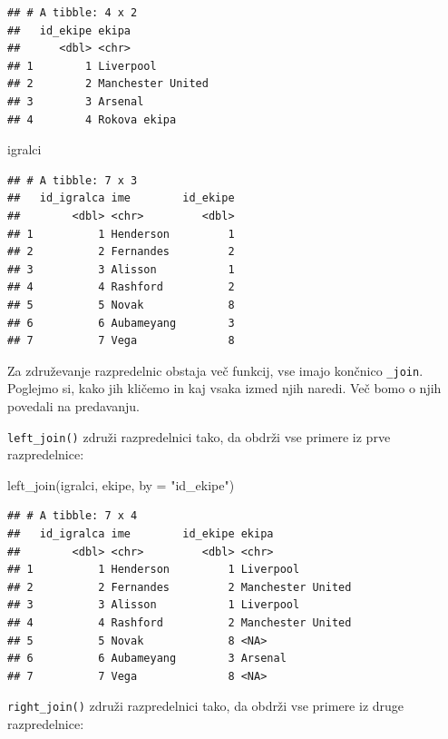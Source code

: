 \documentclass[
]{book}
\newenvironment{Shaded}{\begin{snugshade}}{\end{snugshade}}
\newcommand{\AttributeTok}[1]{\textcolor[rgb]{0.77,0.63,0.00}{#1}}
\newcommand{\FunctionTok}[1]{\textcolor[rgb]{0.00,0.00,0.00}{#1}}
\newcommand{\NormalTok}[1]{#1}
\newcommand{\StringTok}[1]{\textcolor[rgb]{0.31,0.60,0.02}{#1}}
\begin{document}
\begin{verbatim}
## # A tibble: 4 x 2
##   id_ekipe ekipa            
##      <dbl> <chr>            
## 1        1 Liverpool        
## 2        2 Manchester United
## 3        3 Arsenal          
## 4        4 Rokova ekipa
\end{verbatim}

\begin{Shaded}
\begin{Highlighting}[]
\NormalTok{igralci}
\end{Highlighting}
\end{Shaded}

\begin{verbatim}
## # A tibble: 7 x 3
##   id_igralca ime        id_ekipe
##        <dbl> <chr>         <dbl>
## 1          1 Henderson         1
## 2          2 Fernandes         2
## 3          3 Alisson           1
## 4          4 Rashford          2
## 5          5 Novak             8
## 6          6 Aubameyang        3
## 7          7 Vega              8
\end{verbatim}

Za združevanje razpredelnic obstaja več funkcij, vse imajo končnico \texttt{\_join}. Poglejmo si, kako jih kličemo in kaj vsaka izmed njih naredi. Več bomo o njih povedali na predavanju.

\texttt{left\_join()} združi razpredelnici tako, da obdrži vse primere iz prve razpredelnice:

\begin{Shaded}
\begin{Highlighting}[]
\FunctionTok{left\_join}\NormalTok{(igralci, ekipe, }\AttributeTok{by =} \StringTok{"id\_ekipe"}\NormalTok{)}
\end{Highlighting}
\end{Shaded}

\begin{verbatim}
## # A tibble: 7 x 4
##   id_igralca ime        id_ekipe ekipa            
##        <dbl> <chr>         <dbl> <chr>            
## 1          1 Henderson         1 Liverpool        
## 2          2 Fernandes         2 Manchester United
## 3          3 Alisson           1 Liverpool        
## 4          4 Rashford          2 Manchester United
## 5          5 Novak             8 <NA>             
## 6          6 Aubameyang        3 Arsenal          
## 7          7 Vega              8 <NA>
\end{verbatim}

\texttt{right\_join()} združi razpredelnici tako, da obdrži vse primere iz druge razpredelnice:
\end{document}

